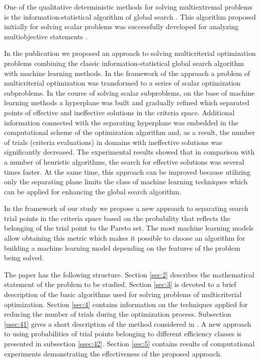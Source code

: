 \documentclass[runningheads]{llncs}
\begin{document}
One of the qualitative deterministic methods for solving multiextremal problems is the  information-statistical algorithm of global search \cite{Strongin2000,Sergeyev2013}. This algorithm proposed initially for solving scalar problems was successfully developed for analyzing multiobjective statements \cite{ML_MCO_2023,Gergel2018,GergelKozinov2020}.

In the publication \cite{ML_MCO_2023} we proposed an approach to solving multicriterial optimization problems combining the classic information-statistical global search algorithm with machine learning methods. In the framework of the approach a problem of multicriterial optimization was transformed to a series of scalar optimization subproblems. In the course of solving scalar subproblems, on the base of machine learning methods a hyperplane was built and gradually refined which separated points of effective and ineffective solutions in the criteria space. Additional information connected with the separating hyperplane was embedded in the computational scheme of the optimization algorithm and, as a result, the number of trials (criteria evaluations) in domains with ineffective solutions was significantly decreased. The experimental results showed that in comparison with a number of heuristic algorithms, the search for effective solutions was several times faster. At the same time, this approach can be improved because utilizing only the separating plane limits the class of machine learning techniques which can be applied for enhancing the global search algorithm.

In the framework of our study we propose a new approach to separating search trial points in the criteria space based on the probability that reflects the belonging of the trial point to the Pareto set. The most machine learning models allow obtaining this metric which makes it possible to choose an algorithm for building a machine learning model depending on the features of the problem being solved.

The paper has the following structure. Section \ref{sec:2} describes the mathematical statement of the problem to be studied. Section \ref{sec:3} is devoted to a brief description of the basic algorithms used for solving problems of multicriterial optimization. Section \ref{sec:4} contains information on the techniques applied for reducing the number of trials during the optimization process. Subsection \ref{ssec:41} gives a short description of the method considered in \cite{ML_MCO_2023}. A new approach to using probabilities of trial points belonging to different efficiency classes is presented in subsection \ref{ssec:42}. Section \ref{sec:5} contains results of computational experiments demonstrating the effectiveness of the proposed approach.
\end{document}
